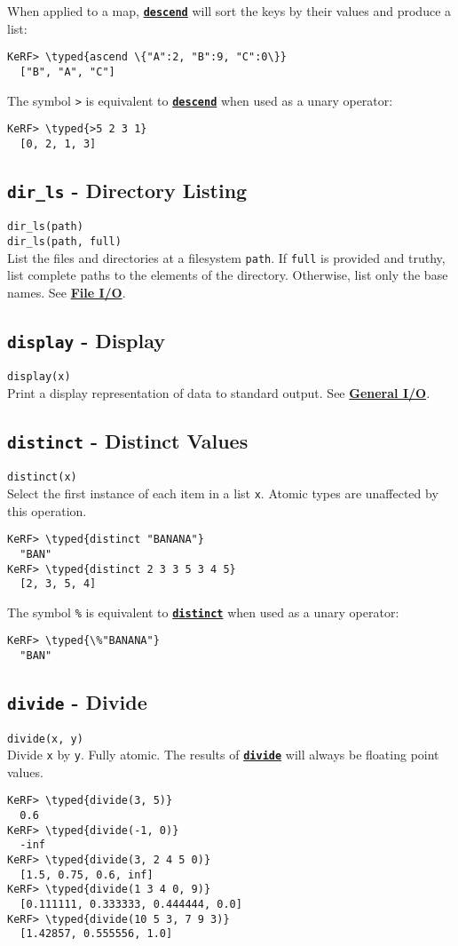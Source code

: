 \documentclass{article}
\newcommand{\typed}[1]{\textcolor{TealBlue}{#1}}
\newcommand{\primdefu}[3]{\subsection{\texttt{#1} - #2}\label{prim:#3}}
\newcommand{\primu}[2]{\hyperref[prim:#2]{\textbf{\texttt{#1}}}}
\newcommand{\primdef}[2]{\primdefu{#1}{#2}{#1}}
\newcommand{\prim}[1]{\primu{#1}{#1}}
\begin{document}
When applied to a map, \prim{descend} will sort the keys by their values and produce a list:
\begin{Verbatim}
KeRF> \typed{ascend \{"A":2, "B":9, "C":0\}}
  ["B", "A", "C"]
\end{Verbatim}

The symbol \texttt{>} is equivalent to \prim{descend} when used as a unary operator:
\begin{Verbatim}
KeRF> \typed{>5 2 3 1}
  [0, 2, 1, 3]
\end{Verbatim}

\primdefu{dir\_ls}{Directory Listing}{dirLs}
\texttt{dir\_ls(path)}\\
\texttt{dir\_ls(path, full)}\\

List the files and directories at a filesystem \texttt{path}. If \texttt{full} is provided and truthy, list complete paths to the elements of the directory. Otherwise, list only the base names. See \hyperref[sec:fileio]{\textbf{File I/O}}.

\primdef{display}{Display}
\texttt{display(x)}\\

Print a display representation of data to standard output. See \hyperref[sec:genio]{\textbf{General I/O}}.

\primdef{distinct}{Distinct Values}
\texttt{distinct(x)}\\

Select the first instance of each item in a list \texttt{x}. Atomic types are unaffected by this operation.
\begin{Verbatim}
KeRF> \typed{distinct "BANANA"}
  "BAN"
KeRF> \typed{distinct 2 3 3 5 3 4 5}
  [2, 3, 5, 4]
\end{Verbatim}

The symbol \texttt{\%} is equivalent to \prim{distinct} when used as a unary operator:
\begin{Verbatim}
KeRF> \typed{\%"BANANA"}
  "BAN"
\end{Verbatim}

\primdef{divide}{Divide}
\texttt{divide(x, y)}\\

Divide \texttt{x} by \texttt{y}. Fully atomic. The results of \prim{divide} will always be floating point values.
\begin{Verbatim}
KeRF> \typed{divide(3, 5)}
  0.6
KeRF> \typed{divide(-1, 0)}
  -inf
KeRF> \typed{divide(3, 2 4 5 0)}
  [1.5, 0.75, 0.6, inf]
KeRF> \typed{divide(1 3 4 0, 9)}
  [0.111111, 0.333333, 0.444444, 0.0]
KeRF> \typed{divide(10 5 3, 7 9 3)}
  [1.42857, 0.555556, 1.0]
\end{Verbatim}
\end{document}
